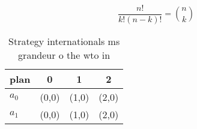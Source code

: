 \documentclass[a4paper]{article}
\begin{document}
\[ \frac{n!}{k!(n-k)!} = \binom{n}{k} \]

\begin{table}
\begin{adjustbox}{width=0.6\columnwidth}
\begin{tabular}{|l|l|l|l|}
\hline
\textbf{plan} & \multicolumn{1}{c|}{\textbf{0}} & \multicolumn{1}{c|}{\textbf{1}} & \multicolumn{1}{c|}{\textbf{2}} \\ \hline
\textbf{$a_0$}  & (0,0) & (1,0) & (2,0) \\ \hline
\textbf{$a_1$}  & (0,0) & (1,0) & (2,0) \\ \hline
\end{tabular}
\end{adjustbox}
\caption{Strategy internationals ms grandeur o the wto in 
}
\end{table}
\end{document}
